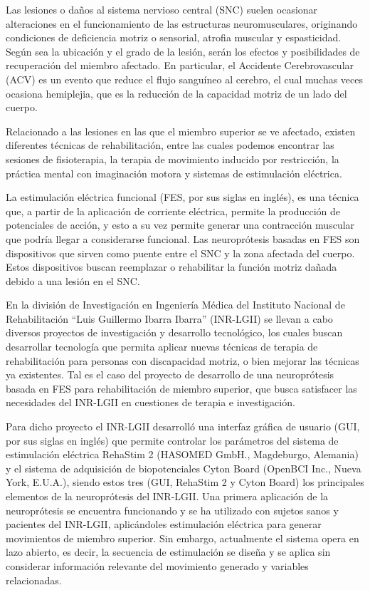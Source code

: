 Las lesiones o daños al sistema nervioso central (SNC) suelen ocasionar alteraciones en el funcionamiento de las estructuras neuromusculares, originando condiciones de deficiencia motriz o sensorial, atrofia muscular y espasticidad. Según sea la ubicación y el grado de la lesión, serán los efectos y posibilidades de recuperación del miembro afectado. En particular, el Accidente Cerebrovascular (ACV) es un evento que reduce el flujo sanguíneo al cerebro, el cual muchas veces ocasiona hemiplejia, que es la reducción de la capacidad motriz de un lado del cuerpo.

Relacionado a las lesiones en las que el miembro superior se ve afectado, existen diferentes técnicas de rehabilitación, entre las cuales podemos encontrar las sesiones de fisioterapia, la terapia de movimiento inducido por restricción, la práctica mental con imaginación motora y sistemas de estimulación eléctrica.

La estimulación eléctrica funcional (FES, por sus siglas en inglés), es una técnica que, a partir de la aplicación de corriente eléctrica, permite la producción de potenciales de acción, y esto a su vez permite generar una contracción muscular que podría llegar a considerarse funcional\cite{Peckham2005}. Las neuroprótesis basadas en FES son dispositivos que sirven como puente entre el SNC y la zona afectada del cuerpo. Estos dispositivos buscan reemplazar o rehabilitar la función motriz dañada debido a una lesión en el SNC.

En la división de Investigación en Ingeniería Médica del Instituto Nacional de Rehabilitación ``Luis Guillermo Ibarra Ibarra'' (INR-LGII) se llevan a cabo diversos proyectos de investigación y desarrollo tecnológico, los cuales buscan desarrollar tecnología que permita aplicar nuevas técnicas de terapia de rehabilitación para personas con discapacidad motriz, o bien mejorar las técnicas ya existentes. Tal es el caso del proyecto de desarrollo de una neuroprótesis basada en FES para rehabilitación de miembro superior, que busca satisfacer las necesidades del INR-LGII en cuestiones de terapia e investigación.

Para dicho proyecto el INR-LGII desarrolló una interfaz gráfica de usuario (GUI, por sus siglas en inglés) que permite controlar los parámetros del sistema de estimulación eléctrica RehaStim 2 (HASOMED GmbH., Magdeburgo, Alemania) y el sistema de adquisición de biopotenciales Cyton Board (OpenBCI Inc., Nueva York, E.U.A.), siendo estos tres (GUI, RehaStim 2 y Cyton Board) los principales elementos de la neuroprótesis del INR-LGII. Una primera aplicación de la neuroprótesis se encuentra funcionando y se ha utilizado con sujetos sanos y pacientes del INR-LGII, aplicándoles estimulación eléctrica para generar movimientos de miembro superior. Sin embargo, actualmente el sistema opera en lazo abierto, es decir, la secuencia de estimulación se diseña y se aplica sin considerar información relevante del movimiento generado y variables relacionadas.

